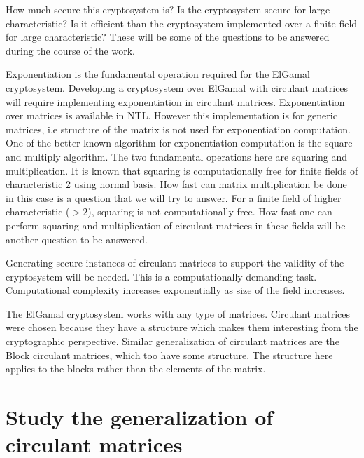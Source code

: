 How much secure this cryptosystem is? Is the cryptosystem secure for large characteristic?
Is it efficient than the cryptosystem implemented over a finite field for large characteristic?
These will be some of the questions to be answered during the course of the work.

Exponentiation is the fundamental operation required for the ElGamal cryptosystem.
Developing a cryptosystem over ElGamal with circulant matrices will require implementing exponentiation in circulant matrices.
Exponentiation over matrices is available in NTL.
However this implementation is for generic matrices, i.e structure of the matrix is not used for exponentiation computation.
One of the better-known algorithm for exponentiation computation is the square and multiply algorithm.
The two fundamental operations here are squaring and multiplication.
It is known that squaring is computationally free for finite fields of characteristic 2 using normal basis.
How fast can matrix multiplication be done in this case is a question that we will try to answer.
For a finite field of higher characteristic ($>$2), squaring is not computationally free.
How fast one can perform squaring and multiplication of circulant matrices in these fields will be another question to be answered.

Generating secure instances of circulant matrices to support the validity of the cryptosystem will be needed.
This is a computationally demanding task.
Computational complexity increases exponentially as size of the field increases.

The ElGamal cryptosystem works with any type of matrices. 
Circulant matrices were chosen because they have a structure which makes them interesting from the cryptographic perspective.
Similar generalization of circulant matrices are the Block circulant matrices, which too have some structure.
The structure here applies to the blocks rather than the elements of the matrix.

\section{Study the generalization of circulant matrices}

